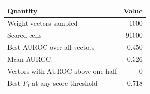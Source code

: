 \begin{tabular}{lr}
\toprule
Quantity & Value \\
\midrule
Weight vectors sampled & 1000 \\
Scored cells & 91000 \\
Best AUROC over all vectors & 0.450 \\
Mean AUROC & 0.326 \\
Vectors with AUROC above one half & 0 \\
Best $F_1$ at any score threshold & 0.718 \\
\bottomrule
\end{tabular}
